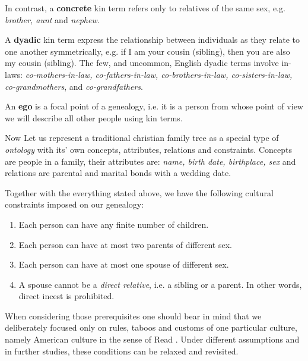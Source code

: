     \begin{definition}
        In contrast, a \textbf{concrete} kin term refers only to relatives of the same sex, e.g. \textit{brother, aunt} and
        \textit{nephew}.
    \end{definition}

    \begin{definition}
        A \textbf{dyadic} kin term express the relationship between individuals as they relate to one another symmetrically, e.g. if I
        am your cousin (sibling), then you are also my cousin (sibling). The few, and uncommon, English dyadic terms involve in-laws:
        \textit{co-mothers-in-law, co-fathers-in-law, co-brothers-in-law, co-sisters-in-law, co-grandmothers}, and
        \textit{co-grandfathers}.
    \end{definition}

    \begin{definition}
        An \textbf{ego} is a focal point of a genealogy, i.e. it is a person from whose point of view we will describe all other
        people using kin terms.
    \end{definition}

    Now Let us represent a traditional christian family tree as a special type of \textit{ontology} with its' own concepts,
    attributes, relations and constraints. Concepts are people in a family, their attributes are: \textit{name, birth date,
    birthplace, sex} and relations are parental and marital bonds with a wedding date.

    Together with the everything stated above, we have the following cultural constraints imposed on our genealogy:
    \begin{enumerate}
        \label{en:req}
        \item{Each person can have any finite number of children.}
        \item{Each person can have at most two parents of different sex.}
        \item{Each person can have at most one spouse of different sex.}
        \item{A spouse cannot be a \textit{direct relative}, i.e. a sibling or a parent. In other words, direct incest is
            prohibited.}
    \end{enumerate}

    When considering those prerequisites one should bear in mind that we deliberately focused only on rules, taboos and
    customs of one particular culture, namely American culture in the sense of Read \cite{read}. Under different assumptions and
    in further studies, these conditions can be relaxed and revisited.


